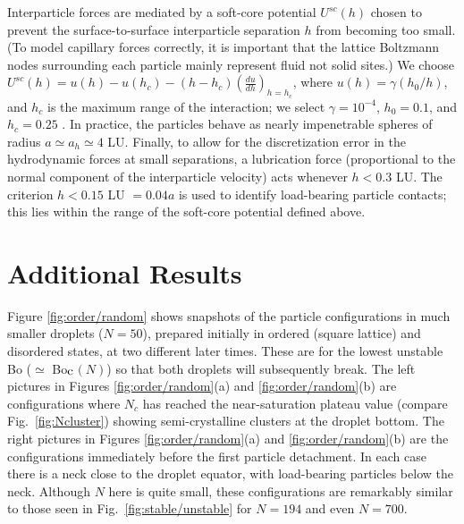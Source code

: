 \documentclass[aps,prl,superscriptaddress,twocolumn,showpacs,floatfix]{revtex4-1}
\newcommand{\Bocm}{Bo$_{\hbox{\rm c}}$}
\begin{document}
Interparticle forces are mediated by a soft-core potential $U^{sc}(h)$ chosen to prevent the surface-to-surface interparticle separation $h$ from becoming too small. (To model capillary forces correctly, it is important that the lattice Boltzmann nodes surrounding each particle mainly represent fluid not solid sites.) We choose $U^{sc}(h)=u(h)-u(h_c)-(h-h_c)(\frac{du}{dh})_{h=h_c}$, where $u(h)=\gamma (h_0/h)$, and $h_c$ is the maximum range of the interaction; we select $\gamma=10^{-4}$, $h_0=0.1$, and $h_c=0.25$ \cite{kim:one}. In practice, the particles behave as nearly impenetrable spheres of radius $a \simeq a_h\simeq 4$ LU. Finally, to allow for the discretization error in the hydrodynamic forces at small separations, a lubrication force (proportional to the normal component of the interparticle velocity) acts whenever $h<0.3$ LU. The criterion $h < 0.15$ LU $= 0.04a$ is used to identify load-bearing particle contacts; this lies within the range of the soft-core potential defined above.

\section{Additional Results}


Figure \ref{fig:order/random} shows snapshots of the particle configurations in much smaller droplets ($N=50$), prepared initially in ordered (square lattice) and disordered states, at two different later times. These are for the lowest unstable Bo ($\simeq$ \Bocm $(N)$) so that both droplets will subsequently break. The left pictures in Figures \ref{fig:order/random}(a) and \ref{fig:order/random}(b) are configurations where $N_{c}$ has reached the near-saturation plateau value (compare Fig.~\ref{fig:Ncluster}) showing semi-crystalline clusters at the droplet bottom. The right pictures in Figures \ref{fig:order/random}(a) and \ref{fig:order/random}(b) are the configurations immediately before the first particle detachment. In each case there is a neck close to the droplet equator, with load-bearing particles below the neck. Although $N$ here is quite small, these configurations are remarkably similar to those seen in Fig.~\ref{fig:stable/unstable} for $N=194$ and even $N = 700$. 
\end{document}
